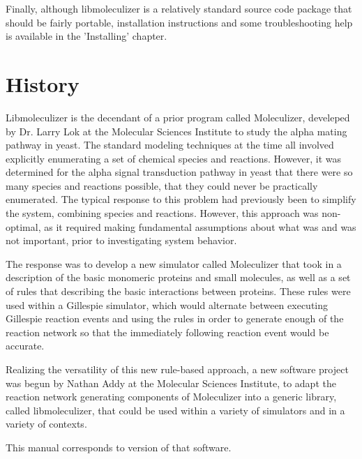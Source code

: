 Finally, although libmoleculizer is a relatively standard source code
package that should be fairly portable, installation instructions and
some troubleshooting help is available in the 'Installing' chapter.

\section{History}
Libmoleculizer is the decendant of a prior program called Moleculizer,
develeped by Dr. Larry Lok at the Molecular Sciences Institute to
study the alpha mating pathway in yeast. The standard modeling
techniques at the time all involved explicitly enumerating a set of
chemical species and reactions. However, it was determined for the
alpha signal transduction pathway in yeast that there were so many
species and reactions possible, that they could never be practically
enumerated. The typical response to this problem had previously been
to simplify the system, combining species and reactions. However,
this approach was non-optimal, as it required making fundamental
assumptions about what was and was not important, prior to
investigating system behavior. 

The response was to develop a new simulator called Moleculizer that
took in a description of the basic monomeric proteins and small
molecules, as well as a set of rules that describing the basic
interactions between proteins. These rules were used within a
Gillespie simulator, which would alternate between executing Gillespie
reaction events and using the rules in order to generate enough of the
reaction network so that the immediately following reaction event
would be accurate.  

Realizing the versatility of this new rule-based approach, a new
software project was begun by Nathan Addy at the Molecular Sciences
Institute, to adapt the reaction network generating components of
Moleculizer into a generic library, called libmoleculizer, that could
be used within a variety of simulators and in a variety of contexts.

This manual corresponds to version \currentversion of that software.